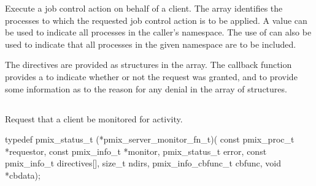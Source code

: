\descr

Execute a job control action on behalf of a client. The  array identifies the processes to which the requested job control action is to be applied.
A  value can be used to indicate all processes in the caller's namespace.
The use of  can also be used to indicate that all processes in the given namespace are to be included.

The directives are provided as  structures in the  array.
The callback function provides a  to indicate whether or not the request was granted, and to provide some information as to the reason for any denial in the  array of  structures.


\subsection{}

\summary

Request that a client be monitored for activity.

\format

\cspecificstart
\begin{codepar}
typedef pmix_status_t (*pmix_server_monitor_fn_t)(
                             const pmix_proc_t *requestor,
                             const pmix_info_t *monitor, pmix_status_t error,
                             const pmix_info_t directives[], size_t ndirs,
                             pmix_info_cbfunc_t cbfunc, void *cbdata);
\end{codepar}
\cspecificend

\begin{arglist}
\end{arglist}

